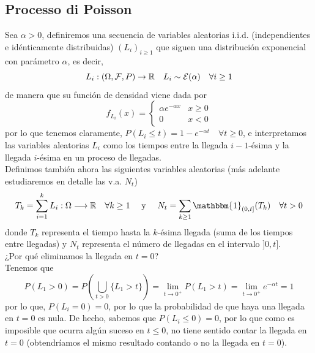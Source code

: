 \subsection{Processo di Poisson}

\noindent
Sea $\alpha>0$, definiremos una secuencia de variables aleatorias i.i.d. (independientes e idénticamente distribuidas) $(L_i)_{i\geq 1}$ que siguen una distribución exponencial con parámetro $\alpha$, es decir,
\begin{equation*}
    L_i:(\Omega, \mathcal{F}, P) \to \mathbb{R} \quad L_i \sim \mathcal{E}(\alpha) \quad \forall i\geq 1
\end{equation*}
de manera que su función de densidad viene dada por
\begin{equation*}
    f_{L_i}(x) = \begin{cases}
    \alpha e^{-\alpha x} & x \geq 0 \\
    0 & x<0
    \end{cases}
\end{equation*}
por lo que tenemos claramente, $P(L_i \leq t) = 1 - e^{-\alpha t} \quad \forall t\geq 0$, e interpretamos las variables aleatorias $L_i$ como los tiempos entre la llegada $i-1$-ésima y la llegada $i$-ésima en un proceso de llegadas. \\

\noindent
Definimos también ahora las siguientes variables aleatorias (más adelante estudiaremos en detalle las v.a. $N_t$)
\begin{equation*}
    T_k=\sum\limits_{i=1}^k L_i:\Omega \longrightarrow \R \quad \forall k\geq 1 \quad \text{ y } \quad N_t= \sum\limits_{k\geq1} \mathbbm{1}_{(0,t]}(T_k) \quad \forall t>0
\end{equation*}
donde $T_k$ representa el tiempo hasta la $k$-ésima llegada (suma de los tiempos entre llegadas) y $N_t$ representa el número de llegadas en el intervalo $]0,t]$. \\

\noindent
{} ¿Por qué eliminamos la llegada en $t=0$? \\
Tenemos que
\begin{equation*}
    P(L_1>0)=P(\bigcup_{t>0} \{L_1 >t\}) = \lim_{t\to 0^+} P(L_1 > t) = \lim_{t\to 0^+} e^{-\alpha t} = 1
\end{equation*}
por lo que, $P(L_i=0)=0$, por lo que la probabilidad de que haya una llegada en $t=0$ es nula. De hecho, sabemos que $P(L_i\leq 0)=0$, por lo que como es imposible que ocurra algún suceso en $t\leq 0$, no tiene sentido contar la llegada en $t=0$ (obtendríamos el mismo resultado contando o no la llegada en $t=0$). \\ 

